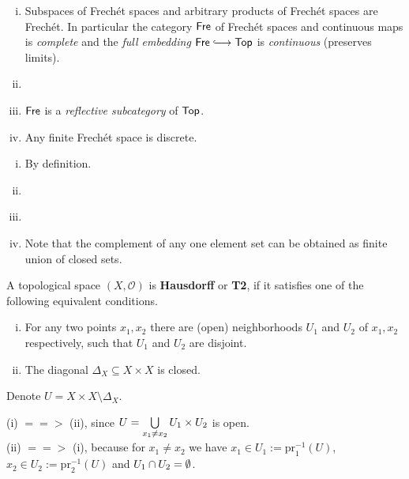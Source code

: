 \begin{lemma}\vspace{-1.5em}
	\begin{enumerate}[(i)]
		\item{
			Subspaces of Frechét spaces and arbitrary products of Frechét spaces are Frechét. In particular the category $\textsf{Fre}$ of Frechét spaces and continuous maps is \textit{complete} and the \textit{full embedding} $\ncat{Fre} \longrightincl \ncat{Top}$ is \textit{continuous} (preserves limits).
		}
		\item{
		}
		\item{
			$\textsf{Fre}$ is a \textit{reflective subcategory} of $\textsf{Top}$.
		}
		\item{
			Any finite Frechét space is discrete.
		}
	\end{enumerate}
\end{lemma}
\begin{sketch}
	\begin{enumerate}[(i)]
		\item{
			By definition.
		}
		\item{
		}
		\item{
		}
		\item{
			Note that the complement of any one element set can be obtained as finite union of closed sets.
		}
	\end{enumerate}
\end{sketch}

\begin{definition}
	A topological space $(X, \mathcal{O})$ is \textbf{Hausdorff} or \textbf{T2}, if it satisfies one of the following equivalent conditions.
	\begin{enumerate}[(i)]
		\item{
			For any two points $x_1,x_2$ there are (open) neighborhoods $U_1$ and $U_2$ of $x_1,x_2$ respectively, such that $U_1$ and $U_2$ are disjoint.
		}
		\item{
			The diagonal $\Delta_X \subseteq X \times X$ is closed.
		}
	\end{enumerate}
\end{definition}
\begin{sketch}
	Denote $U = X \times X \setminus \Delta_X$.

	(i) $==>$ (ii), since $U = \bigcup \limits_{x_1 \neq x_2} U_1 \times U_2$ is open.\\
	(ii) $==>$ (i), because for $x_1 \neq x_2$ we have $x_1 \in U_1 := \text{pr}_1^{-1}(U)$, $x_2 \in U_2 := \text{pr}_2^{-1}(U)$ and $U_1 \cap U_2 = \emptyset$.
\end{sketch}

